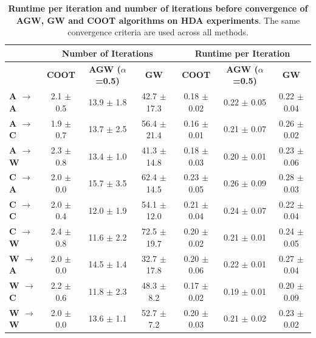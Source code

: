 \begin{table}[t]
\small
\begin{tabular}{@{}lccc|ccc@{}}
\toprule
                           & \multicolumn{3}{c|}{\textbf{Number of Iterations}}                      & \multicolumn{3}{c}{\textbf{Runtime per Iteration}}                     \\ \midrule
                           & \textbf{COOT}        & \textbf{AGW ($\alpha$=0.5)} & \textbf{GW}           & \textbf{COOT}        & \textbf{AGW ($\alpha$=0.5)} & \textbf{GW}          \\
\textbf{A $\rightarrow$ A} & 2.1 $\pm$ 0.5               & 13.9 $\pm$ 1.8              & 42.7 $\pm$ 17.3          & 0.18 $\pm$ 0.02         & 0.22 $\pm$ 0.05             & 0.22 $\pm$ 0.04         \\
\textbf{A $\rightarrow$ C} & 1.9 $\pm$ 0.7               & 13.7 $\pm$ 2.5              & 56.4 $\pm$ 21.4          & 0.16 $\pm$ 0.01         & 0.21 $\pm$ 0.07             & 0.26 $\pm$ 0.02         \\
\textbf{A $\rightarrow$ W} & 2.3 $\pm$ 0.8               & 13.4 $\pm$ 1.0              &41.3 $\pm$ 14.8          & 0.18 $\pm$ 0.03         & 0.20 $\pm$ 0.01            & 0.23 $\pm$ 0.06        \\
\textbf{C $\rightarrow$ A} & 2.0 $\pm$ 0.0               & 15.7 $\pm$ 3.5              & 62.4 $\pm$ 14.5         & 0.23 $\pm$ 0.05         & 0.26 $\pm$ 0.09             & 0.28 $\pm$ 0.03         \\
\textbf{C $\rightarrow$ C} & 2.0 $\pm$ 0.4               & 12.0 $\pm$ 1.9              & 54.1 $\pm$ 12.0         & 0.21 $\pm$ 0.04         & 0.24 $\pm$ 0.07             & 0.22 $\pm$ 0.04         \\
\textbf{C $\rightarrow$ W} & 2.4 $\pm$ 0.8               & 11.6 $\pm$ 2.2              & 72.5 $\pm$ 19.7         & 0.20 $\pm$ 0.02         & 0.21 $\pm$ 0.01             & 0.24 $\pm$ 0.05         \\
\textbf{W $\rightarrow$ A} & 2.0 $\pm$ 0.0              & 14.5 $\pm$ 1.4              & 32.7 $\pm$ 17.8          & 0.20 $\pm$ 0.06         & 0.22 $\pm$ 0.01             & 0.27 $\pm$ 0.04         \\
\textbf{W $\rightarrow$ C} & 2.2 $\pm$ 0.6               & 11.8 $\pm$ 2.3              & 48.3 $\pm$ 8.2           & 0.17 $\pm$ 0.02         & 0.19 $\pm$ 0.01             & 0.20 $\pm$ 0.09         \\
\textbf{W $\rightarrow$ W}  & 2.0 $\pm$ 0.0               & 13.6 $\pm$ 1.1              & 52.7 $\pm$ 7.2          & 0.20 $\pm$ 0.03        & 0.21 $\pm$ 0.02             & 0.23 $\pm$ 0.02 \\ \bottomrule
\end{tabular}
\caption{\label{tabSI:runtime}
\textbf{Runtime per iteration and number of iterations before convergence of AGW, GW and COOT
algorithms on HDA experiments}. The same convergence criteria are used across all methods.}
\end{table}

